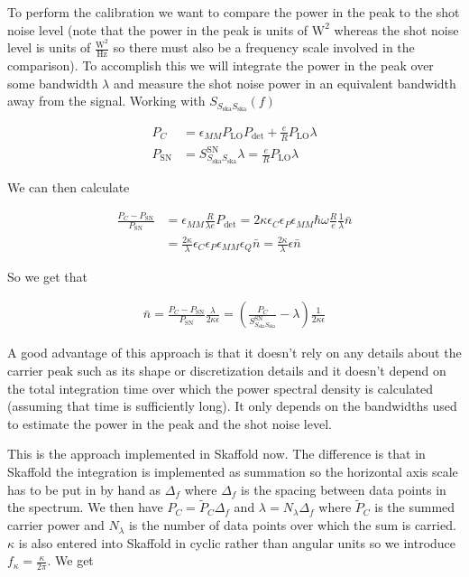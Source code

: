 \documentclass[12pt]{article}
\begin{document}
To perform the calibration we want to compare the power in the peak to the shot noise level (note that the power in the peak is units of $\text{W}^2$ whereas the shot noise level is units of $\frac{\text{W}^2}{\text{Hz}}$ so there must also be a frequency scale involved in the comparison). To accomplish this we will integrate the power in the peak over some bandwidth $\lambda$ and measure the shot noise power in an equivalent bandwidth away from the signal. Working with $S_{S_{\text{ska}}S_{\text{ska}}}(f)$

\begin{align}
P_C &= \epsilon_{MM} P_{\text{LO}}P_{\text{det}} + \frac{e}{R} P_{\text{LO}} \lambda\\
P_{\text{SN}} &= S_{S_{\text{ska}}S_{\text{ska}}}^{\text{SN}} \lambda = \frac{e}{R}P_{\text{LO}} \lambda
\end{align}

We can then calculate

\begin{align}
\frac{P_C - P_{\text{SN}}}{P_{\text{SN}}} &= \epsilon_{MM} \frac{R}{\lambda e}P_{\text{det}} = 2\kappa \epsilon_C \epsilon_P \epsilon_{MM} \hbar \omega \frac{R}{e} \frac{1}{\lambda} \bar{n}\\ 
&= \frac{2 \kappa}{\lambda} \epsilon_C \epsilon_P \epsilon_{MM} \epsilon_Q \bar{n} = \frac{2 \kappa}{\lambda} \epsilon \bar{n}
\end{align}

So we get that

\begin{align}
\bar{n} = \frac{P_C - P_{\text{SN}}}{P_{\text{SN}}} \frac{\lambda}{2\kappa \epsilon} = \left(\frac{P_C}{S_{S_{\text{ska}}S_{\text{ska}}}^{\text{SN}}} - \lambda \right) \frac{1}{2\kappa \epsilon}
\end{align}

A good advantage of this approach is that it doesn't rely on any details about the carrier peak such as its shape or discretization details and it doesn't depend on the total integration time over which the power spectral density is calculated (assuming that time is sufficiently long). It only depends on the bandwidths used to estimate the power in the peak and the shot noise level.

This is the approach implemented in Skaffold now. The difference is that in Skaffold the integration is implemented as summation so the horizontal axis scale has to be put in by hand as $\Delta_f$ where $\Delta_f$ is the spacing between data points in the spectrum. We then have $P_C = \tilde{P}_C \Delta_f$ and $\lambda = N_{\lambda}\Delta_f$ where $\tilde{P}_C$ is the summed carrier power and $N_{\lambda}$ is the number of data points over which the sum is carried. $\kappa$ is also entered into Skaffold in cyclic rather than angular units so we introduce $f_{\kappa} = \frac{\kappa}{2\pi}$. We get
\end{document}
